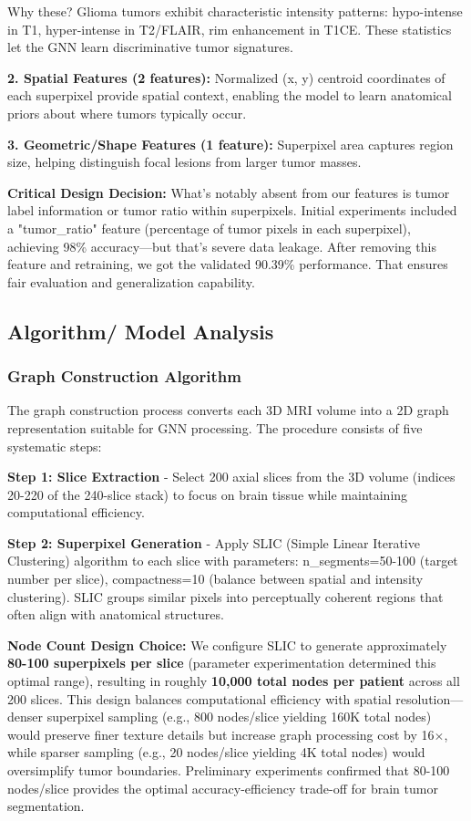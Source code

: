 Why these? Glioma tumors exhibit characteristic intensity patterns: hypo-intense in T1, hyper-intense in T2/FLAIR, rim enhancement in T1CE. These statistics let the GNN learn discriminative tumor signatures.

\textbf{2. Spatial Features (2 features):} Normalized (x, y) centroid coordinates of each superpixel provide spatial context, enabling the model to learn anatomical priors about where tumors typically occur.

\textbf{3. Geometric/Shape Features (1 feature):} Superpixel area captures region size, helping distinguish focal lesions from larger tumor masses.

\textbf{Critical Design Decision:} What's notably absent from our features is tumor label information or tumor ratio within superpixels. Initial experiments included a "tumor\_ratio" feature (percentage of tumor pixels in each superpixel), achieving 98\% accuracy—but that's severe data leakage. After removing this feature and retraining, we got the validated 90.39\% performance. That ensures fair evaluation and generalization capability.


\subsection{Algorithm/ Model Analysis}

\subsubsection{Graph Construction Algorithm}

The graph construction process converts each 3D MRI volume into a 2D graph representation suitable for GNN processing. The procedure consists of five systematic steps:

\textbf{Step 1: Slice Extraction} - Select 200 axial slices from the 3D volume (indices 20-220 of the 240-slice stack) to focus on brain tissue while maintaining computational efficiency.

\textbf{Step 2: Superpixel Generation} - Apply SLIC (Simple Linear Iterative Clustering) algorithm to each slice with parameters: n\_segments=50-100 (target number per slice), compactness=10 (balance between spatial and intensity clustering). SLIC groups similar pixels into perceptually coherent regions that often align with anatomical structures.

\textbf{Node Count Design Choice:} We configure SLIC to generate approximately \textbf{80-100 superpixels per slice} (parameter experimentation determined this optimal range), resulting in roughly \textbf{10,000 total nodes per patient} across all 200 slices. This design balances computational efficiency with spatial resolution—denser superpixel sampling (e.g., 800 nodes/slice yielding 160K total nodes) would preserve finer texture details but increase graph processing cost by 16$\times$, while sparser sampling (e.g., 20 nodes/slice yielding 4K total nodes) would oversimplify tumor boundaries. Preliminary experiments confirmed that 80-100 nodes/slice provides the optimal accuracy-efficiency trade-off for brain tumor segmentation.

